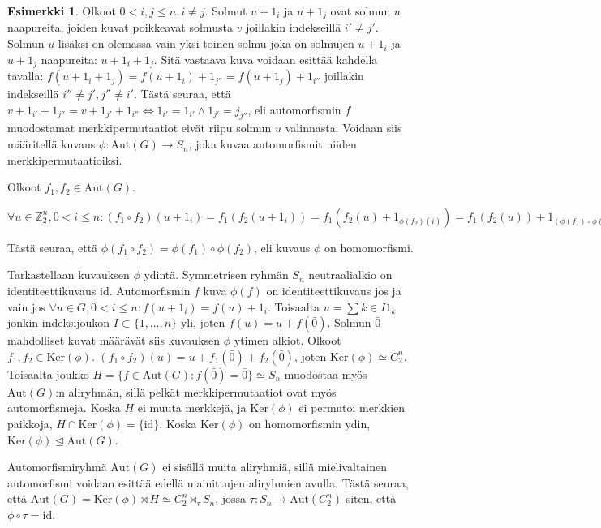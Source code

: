 \documentclass[a4paper, 12pt]{article}
\theoremstyle{definition}
\newtheorem{example}[mydef]{Esimerkki}
\theoremstyle{plain}
\begin{document}
\begin{example}
Olkoot $0 < i, j \leq n, i \neq j$. Solmut $u + 1_i$ ja $u+ 1_j$ ovat solmun $u$ naapureita, joiden kuvat poikkeavat solmusta $v$ joillakin indekseillä $i' \neq j'$. Solmun $u$ lisäksi on olemassa vain yksi toinen solmu joka on solmujen $u + 1_i$ ja $u + 1_j$ naapureita: $u + 1_i + 1_j$. Sitä vastaava kuva voidaan esittää kahdella tavalla: $f(u + 1_i + 1_j) = f(u + 1_i) + 1_{j''} = f(u + 1_j) + 1_{i''}$ joillakin indekseillä $i'' \neq j', j'' \neq i'$. Tästä seuraa, että $v + 1_{i'} + 1_{j''} = v + 1_{j'} + 1_{i''} \Leftrightarrow 1_{i'} = 1_{i'} \wedge 1_{j'} = j_{j''}$, eli  automorfismin $f$ muodostamat merkkipermutaatiot eivät riipu solmun $u$ valinnasta. Voidaan siis määritellä kuvaus ${\phi: \mathrm{Aut}(G) \rightarrow S_n}$, joka kuvaa automorfismit niiden merkkipermutaatioiksi.

Olkoot $f_1, f_2 \in \mathrm{Aut}(G)$. 
\begin{center}
\begin{math}
\forall u \in \mathbb{Z}_2^n, 0 < i \leq n: (f_1 \circ f_2)(u + 1_i) = f_1(f_2(u + 1_i))
= f_1(f_2(u) + 1_{\phi(f_2)(i)}) = f_1(f_2(u)) + 1_{(\phi(f_1) \circ \phi(f_2))(i)}
\end{math}
\end{center}
Tästä seuraa, että $\phi(f_1 \circ f_2) = \phi(f_1) \circ \phi(f_2)$, eli kuvaus $\phi$ on homomorfismi.

Tarkastellaan kuvauksen $\phi$ ydintä. Symmetrisen ryhmän $S_n$ neutraalialkio on identiteettikuvaus $\mathrm{id}$. Automorfismin $f$ kuva $\phi(f)$ on identiteettikuvaus jos ja vain jos $ \forall u \in G, 0 < i \leq n: f(u + 1_i) = f(u) + 1_i$. Toisaalta $u = \sum{k \in I} 1_k$ jonkin indeksijoukon $I \subset \{1, \dots , n\}$ yli, joten $f(u) = u + f(\bar{0})$. Solmun $\bar{0}$ mahdolliset kuvat määrävät siis kuvauksen $\phi$ ytimen alkiot. Olkoot $f_1, f_2 \in \mathrm{Ker}(\phi)$. $(f_1 \circ f_2)(u) = u + f_1(\bar{0}) + f_2(\bar{0})$, joten $\mathrm{Ker}(\phi) \simeq C_2^n$. Toisaalta joukko $H = \{f \in \mathrm{Aut}(G) : f(\bar{0}) = \bar{0}\} \simeq S_n$ muodostaa myös $\mathrm{Aut}(G)$:n aliryhmän, sillä pelkät merkkipermutaatiot ovat myös automorfismeja. Koska $H$ ei muuta merkkejä, ja $\mathrm{Ker}(\phi)$ ei permutoi merkkien paikkoja, $H \cap \mathrm{Ker}(\phi) = \{ \mathrm{id} \}$. Koska $\mathrm{Ker}(\phi)$ on homomorfismin ydin, $\mathrm{Ker}(\phi) \trianglelefteq \mathrm{Aut}(G)$.

Automorfismiryhmä $\mathrm{Aut}(G)$ ei sisällä muita aliryhmiä, sillä mielivaltainen automorfismi voidaan esittää edellä mainittujen aliryhmien avulla. Tästä seuraa, että $\mathrm{Aut}(G) = \mathrm{Ker}(\phi) \rtimes H \simeq C_2^n \rtimes_\tau S_n$, jossa $\tau: S_n \rightarrow \mathrm{Aut}(C_2^n)$ siten, että $\phi \circ \tau = \mathrm{id}$.
\end{example}
\end{document}
